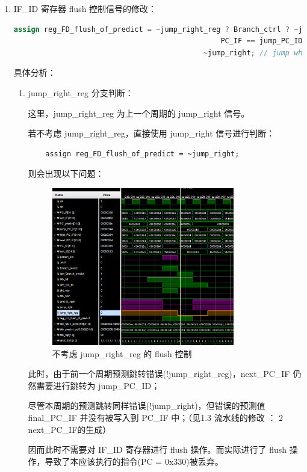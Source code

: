 \documentclass{article}
\begin{document}
\begin{enumerate}
    \item IF\_ID 寄存器 flush 控制信号的修改：\par
    \begin{lstlisting}[language=Verilog]
    assign reg_FD_flush_of_predict = ~jump_right_reg ? Branch_ctrl ? ~jump_right : 
                                                PC_IF == jump_PC_ID : // jump right
                                            ~jump_right; // jump when no branch
    \end{lstlisting}

    具体分析：\par
    \begin{enumerate}
        \item jump\_right\_reg 分支判断：\par
        这里，jump\_right\_reg 为上一个周期的 jump\_right 信号。\par

        若不考虑 jump\_right\_reg，直接使用 jump\_right 信号进行判断：\par
        \begin{lstlisting}
    assign reg_FD_flush_of_predict = ~jump_right;
        \end{lstlisting}

        \newpage
        则会出现以下问题：\par
        \begin{figure}[h]
            \centering
            \includegraphics[width=0.8\textwidth]{image/flush_jump_right_reg.png}
            \caption{不考虑 jump\_right\_reg 的 flush 控制}
        \end{figure}

        此时，由于前一个周期预测跳转错误(!jump\_right\_reg)，next\_PC\_IF 仍然需要进行跳转为 jump\_PC\_ID；\par
        尽管本周期的预测跳转同样错误(!jump\_right)，但错误的预测值 final\_PC\_IF 并没有被写入到 PC\_IF 中；（见1.3 流水线的修改 ： 2 next\_PC\_IF的生成）\par
        因而此时不需要对 IF\_ID 寄存器进行 flush 操作。而实际进行了 flush 操作，导致了本应该执行的指令(PC = 0x330)被丢弃。\par
    

\end{enumerate}
\end{enumerate}
\end{document}
